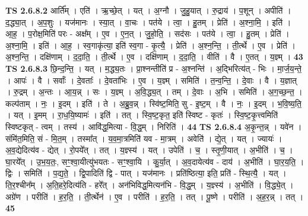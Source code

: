 \documentclass[17pt]{extarticle}
\begin{document}
                  \newline
                                \textbf{ TS 2.6.8.2} \newline
                  आर्ति᳚म् । एति॑ । ऋ॒च्छे॒त् । यत् । अ॒ग्नौ । जु॒हु॒यात् । रु॒द्राय॑ । प॒शून् । अपीति॑ । द॒द्ध्या॒त् । अ॒प॒शुः । यज॑मानः । स्या॒त् । वा॒चः । पत॑ये । त्वा॒ । हु॒तम् । प्रेति॑ । अ॒श्ना॒मि॒ । इति॑ । आ॒ह॒ । प॒रोक्ष॒मिति॑ परः - अक्ष᳚म् । ए॒व । ए॒न॒त् । जु॒हो॒ति॒ । सद॑सः । पत॑ये । त्वा॒ । हु॒तम् । प्रेति॑ । अ॒श्ना॒मि॒ । इति॑ । आ॒ह॒ । स्व॒गाकृ॑त्या॒ इति॑ स्व॒गा - कृ॒त्यै॒ । प्रेति॑ । अ॒श्न॒न्ति॒ । ती॒र्त्थे । ए॒व । प्रेति॑ । अ॒श्न॒न्ति॒ । दक्षि॑णाम् । द॒दा॒ति॒ । ती॒र्त्थे । ए॒व । दक्षि॑णाम् । द॒दा॒ति॒ । वीति॑ । वै । ए॒तत् । य॒ज्ञ्म् । \textbf{  43} \newline
                  \newline
                                \textbf{ TS 2.6.8.3} \newline
                  छि॒न्द॒न्ति॒ । यत् । म॒द्ध्य॒तः । प्रा॒श्नन्तीति॑ प्र - अ॒श्नन्ति॑ । अ॒द्भिरित्य॑त् - भिः । मा॒र्ज॒य॒न्ते॒ । आपः॑ । वै । सर्वाः᳚ । दे॒वताः᳚ । दे॒वता॑भिः । ए॒व । य॒ज्ञ्म् । समिति॑ । त॒न्व॒न्ति॒ । दे॒वाः । वै । य॒ज्ञात् । रु॒द्रम् । अ॒न्तः । आ॒य॒न्न् । सः । य॒ज्ञ्म् । अ॒वि॒द्ध्य॒त् । तम् । दे॒वाः । अ॒भि । समिति॑ । अ॒ग॒च्छ॒न्त॒ । कल्प॑ताम् । नः॒ । इ॒दम् । इति॑ । ते । अ॒ब्रु॒व॒न्न् । स्वि॑ष्ट॒मिति॒ सु - इ॒ष्ट॒म् । वै । नः॒ । इ॒दम् । भ॒वि॒ष्य॒ति॒ । यत् । इ॒मम् । रा॒ध॒यि॒ष्यामः॑ । इति॑ । तत् । स्वि॒ष्ट॒कृत॒ इति॑ स्विष्ट - कृतः॑ । स्वि॒ष्ट॒कृ॒त्त्वमिति॑ स्विष्टकृत् - त्वम् । तस्य॑ । आवि॑द्ध॒मित्या - वि॒द्ध॒म् । निरिति॑ । \textbf{  44} \newline
                  \newline
                                \textbf{ TS 2.6.8.4} \newline
                  अ॒कृ॒न्त॒न्न् । यवे॑न । संमि॑त॒मिति॒ सं - मि॒त॒म् । तस्मा᳚त् । य॒व॒मा॒त्रमिति॑ यव - मा॒त्रम् । अवेति॑ । द्ये॒त् । यत् । ज्यायः॑ । अ॒व॒द्येदित्य॑व - द्येत् । रो॒पये᳚त् । तत् । य॒ज्ञ्स्य॑ । यत् । उपेति॑ । च॒ । स्तृ॒णी॒यात् । अ॒भीति॑ । च॒ । घा॒रये᳚त् । उ॒भ॒य॒तः॒, सꣳ॒॒श्वा॒यीत्यु॑भयतः - सꣳ॒॒श्वा॒यि । कु॒र्या॒त् । अ॒व॒दायेत्य॑व - दाय॑ । अ॒भीति॑ । घा॒र॒य॒ति॒ । द्विः । समिति॑ । प॒द्य॒ते॒ । द्वि॒पादिति॑ द्वि - पात् । यज॑मानः । प्रति॑ष्ठित्या॒ इति॒ प्रति॑ - स्थि॒त्यै॒ । यत् । ति॒र॒श्चीन᳚म् । अ॒ति॒हरे॒दित्य॑ति - हरे᳚त् । अन॑भिविद्ध॒मित्यन॑भि - वि॒द्ध॒म् । य॒ज्ञ्स्य॑ । अ॒भीति॑ । वि॒द्ध्ये॒त् । अग्रे॑ण । परीति॑ । ह॒र॒ति॒ । ती॒र्त्थेन॑ । ए॒व । परीति॑ । ह॒र॒ति॒ । तत् । पू॒ष्णे । परीति॑ । अ॒ह॒र॒न्न् । तत् । \textbf{  45} \newline
\end{document}
